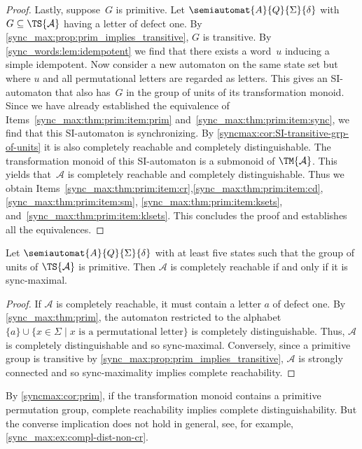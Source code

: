 \begin{proof}
Lastly, suppose~$G$ is primitive.
Let $\semiautomat{A}{Q}{\Sigma}{\delta}$ 
with $G \subseteq \TS{\mathcal A}$ having a letter of defect one.
By \cref{sync_max:prop:prim_implies_transitive}, $G$ is transitive.
By \cref{sync_words:lem:idempotent} we find that there exists a word~$u$
inducing a simple idempotent. Now consider a new automaton on the same state set
but where $u$ and all permutational letters are regarded as letters.
This gives an SI-automaton that also has~$G$ in the group of units of its transformation monoid.
Since we have already established the equivalence of Items~\ref{sync_max:thm:prim:item:prim} 
and~\ref{sync_max:thm:prim:item:sync}, we find that this SI-automaton is synchronizing.
By \cref{syncmax:cor:SI-transitive-grp-of-units} it is also completely reachable
and completely distinguishable. The transformation monoid of this SI-automaton is a submonoid of $\TM{\mathcal A}$. 
This yields that~$\mathcal A$
is completely reachable and completely distinguishable.
Thus we obtain
Items~\ref{sync_max:thm:prim:item:cr},\ref{sync_max:thm:prim:item:cd},\ref{sync_max:thm:prim:item:sm},
\ref{sync_max:thm:prim:item:ksets}, and~\ref{sync_max:thm:prim:item:klsets}.
This concludes the proof and establishes all the equivalences.
\end{proof}

\begin{corollary} \label{syncmax:cor:prim}
	Let $\semiautomat{A}{Q}{\Sigma}{\delta}$
	with at least five states 
	such that the group of units of $\TS{\mathcal A}$ is primitive.
	Then $\mathcal A$ is completely reachable if and only if it is sync-maximal.	
\end{corollary}
\begin{proof}
	If $\mathcal A$ is completely reachable, it must contain a letter $a$ of defect one.
	By \cref{sync_max:thm:prim},
	the automaton restricted to the alphabet
	$\{a\} \cup \{ x \in \Sigma \mid \text{$x$ is a permutational letter} \}$
	is completely distinguishable.
	Thus, $\mathcal A$
	is completely distinguishable
	and so sync-maximal.	
	Conversely, since a primitive group is transitive by \cref{sync_max:prop:prim_implies_transitive}, 
	$\mathcal A$ is strongly connected and so sync-maximality
	implies complete reachability.		
\end{proof}

By \cref{syncmax:cor:prim}, if the transformation monoid contains a primitive permutation group,
complete reachability implies complete distinguishability.
But the converse implication does not hold in general,
see, for example, \cref{sync_max:ex:compl-dist-non-cr}.


